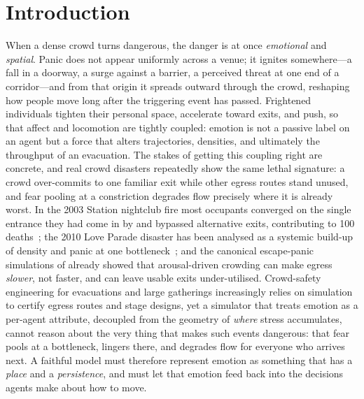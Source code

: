 \documentclass[sigconf,nonacm]{acmart}
\begin{document}
\section{Introduction}
When a dense crowd turns dangerous, the danger is at once \emph{emotional} and \emph{spatial}. Panic does not appear uniformly across a venue; it ignites somewhere---a fall in a doorway, a surge against a barrier, a perceived threat at one end of a corridor---and from that origin it spreads outward through the crowd, reshaping how people move long after the triggering event has passed. Frightened individuals tighten their personal space, accelerate toward exits, and push, so that affect and locomotion are tightly coupled: emotion is not a passive label on an agent but a force that alters trajectories, densities, and ultimately the throughput of an evacuation. The stakes of getting this coupling right are concrete, and real crowd disasters repeatedly show the same lethal signature: a crowd over-commits to one familiar exit while other egress routes stand unused, and fear pooling at a constriction degrades flow precisely where it is already worst. In the 2003 Station nightclub fire most occupants converged on the single entrance they had come in by and bypassed alternative exits, contributing to 100 deaths~\cite{nist2005station}; the 2010 Love Parade disaster has been analysed as a systemic build-up of density and panic at one bottleneck~\cite{helbing2012love}; and the canonical escape-panic simulations of \citet{helbing2000panic} already showed that arousal-driven crowding can make egress \emph{slower}, not faster, and can leave usable exits under-utilised. Crowd-safety engineering for evacuations and large gatherings increasingly relies on simulation to certify egress routes and stage designs, yet a simulator that treats emotion as a per-agent attribute, decoupled from the geometry of \emph{where} stress accumulates, cannot reason about the very thing that makes such events dangerous: that fear pools at a bottleneck, lingers there, and degrades flow for everyone who arrives next. A faithful model must therefore represent emotion as something that has a \emph{place} and a \emph{persistence}, and must let that emotion feed back into the decisions agents make about how to move.
\end{document}
